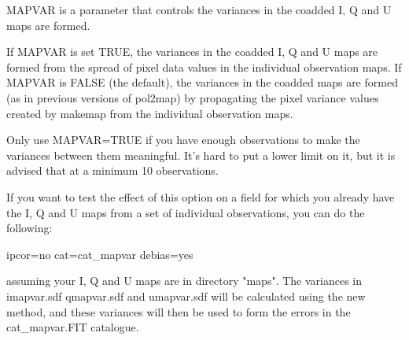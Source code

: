 MAPVAR is a parameter that controls the variances in the coadded 
I, Q and U maps are formed.

If  MAPVAR is set TRUE, the variances in the coadded I, Q and U maps
are formed from the spread of pixel data values in the individual
observation maps. If MAPVAR is FALSE (the default), the variances in
the coadded maps are formed (as in previous versions of pol2map) by
propagating the pixel variance values created by makemap from the
individual observation maps.

Only use MAPVAR=TRUE if you have enough observations to
make the variances between them meaningful. It's hard to put a lower
limit on it, but it is advised that at a minimum 10 observations.


If you want to test the effect of this option on a field for which you
already have the I, Q and U maps from a set of individual
observations, you can do the following:

\begin{terminalv}
                   ipcor=no cat=cat_mapvar debias=yes
\end{terminalv}

assuming your I, Q and U maps are in directory "maps". The variances
in imapvar.sdf qmapvar.sdf and umapvar.sdf will be calculated using
the new method, and these variances will then be used to form the
errors in the cat_mapvar.FIT catalogue.



